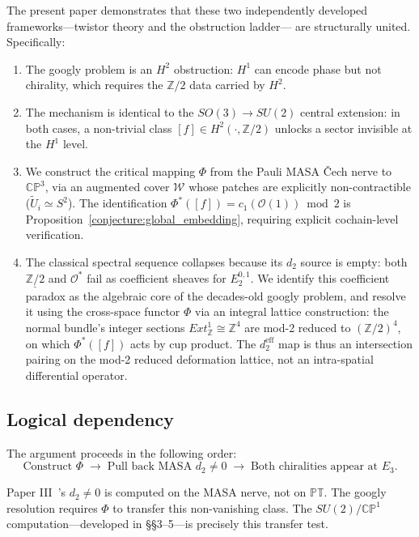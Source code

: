 \documentclass[11pt,a4paper]{article}
\theoremstyle{remark}
\newcommand{\PT}{\mathbb{PT}}
\newcommand{\CP}{\mathbb{CP}}
\newcommand{\Z}{\mathbb{Z}}
\newcommand{\cO}{\mathcal{O}}
\begin{document}
The present paper demonstrates that these two independently
developed frameworks---twistor theory and the obstruction ladder---
are structurally united. Specifically:
\begin{enumerate}
  \item The googly problem is an $H^2$ obstruction: $H^1$ can encode
    phase but not chirality, which requires the $\Z/2$ data carried
    by $H^2$.
  \item The mechanism is identical to the $SO(3) \to SU(2)$ central
    extension: in both cases, a non-trivial class
    $[f] \in H^2(\cdot, \Z/2)$ unlocks a sector invisible at the
    $H^1$ level.
  \item We construct the critical mapping $\Phi$ from the Pauli MASA
    \v{C}ech nerve to $\CP^3$, via an augmented cover $\mathcal{W}$
    whose patches are explicitly non-contractible ($\tilde{U}_i \simeq S^2$).
    The identification $\Phi^*([f]) = c_1(\cO(1)) \bmod 2$ is
    Proposition~\ref{conjecture:global_embedding}, requiring explicit cochain-level verification.
  \item The classical spectral sequence collapses because its $d_2$
    source is empty: both $\underline{\Z/2}$ and $\cO^*$ fail as
    coefficient sheaves for $E_2^{0,1}$. We identify this coefficient
    paradox as the algebraic core of the decades-old googly problem,
    and resolve it using the cross-space functor $\Phi$ via an
    integral lattice construction: the normal bundle's integer sections
    $Ext^1_{\Z} \cong \Z^4$ are mod-2 reduced to $(\Z/2)^4$, on which
    $\Phi^*([f])$ acts by cup product. The $d_2^{\text{eff}}$ map is
    thus an intersection pairing on the mod-2 reduced deformation
    lattice, not an intra-spatial differential operator.
  \end{enumerate}

\subsection*{Logical dependency}

The argument proceeds in the following order:
\[
  \text{Construct } \Phi \;\to\;
  \text{Pull back MASA } d_2 \neq 0 \;\to\;
  \text{Both chiralities appear at } E_3.
\]

Paper III~\cite{PaperIII}'s $d_2 \neq 0$ is computed on the MASA nerve, not on $\PT$.
The googly resolution requires $\Phi$ to transfer this non-vanishing
class. The $SU(2)/\CP^1$ computation---developed in \S\S 3--5---is
precisely this transfer test.
\end{document}
